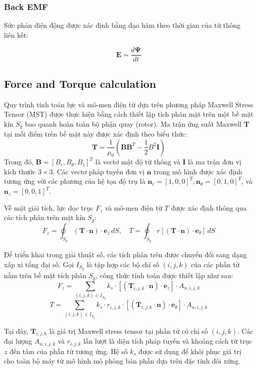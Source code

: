 \subsubsection{Back EMF}
Sức phản điện động được xác định bằng đạo hàm theo thời gian của từ thông liên kết:

\begin{equation}
\mathbf{E} = \frac{d\mathbf{\Psi}}{dt}
\end{equation}


\subsection{Force and Torque calculation}

Quy trình tính toán lực và mô-men điện từ dựa trên phương pháp Maxwell Stress Tensor (MST) được thực hiện bằng cách thiết lập tích phân mặt trên một bề mặt kín $S_g$ bao quanh hoàn toàn bộ phận quay (rotor). Ma trận ứng suất Maxwell $\mathbf{T}$ tại mỗi điểm trên bề mặt này được xác định theo biểu thức:
\begin{equation}
    \mathbf{T} = \frac{1}{\mu_0} \left( \mathbf{B} \mathbf{B}^T - \frac{1}{2} B^2 \mathbf{I} \right)
\end{equation}
Trong đó, $\mathbf{B} = [B_r, B_\theta, B_z]^T$ là vectơ mật độ từ thông và $\mathbf{I}$ là ma trận đơn vị kích thước $3 \times 3$. Các vectơ pháp tuyến đơn vị $\mathbf{n}$ trong mô hình được xác định tương ứng với các phương của hệ tọa độ trụ là $\mathbf{n}_r = [1, 0, 0]^T, \mathbf{n}_\theta = [0, 1, 0]^T$, và $\mathbf{n}_z = [0, 0, 1]^T$.

Về mặt giải tích, lực dọc trục $F_z$ và mô-men điện từ $T$ được xác định thông qua các tích phân trên mặt kín $S_g$:
\begin{equation}
    F_z = \oint_{S_g} (\mathbf{T} \cdot \mathbf{n}) \cdot \mathbf{e}_z \, dS, \quad T = \oint_{S_g} r [(\mathbf{T} \cdot \mathbf{n}) \cdot \mathbf{e}_\theta] \, dS
\end{equation}

Để triển khai trong giải thuật số, các tích phân trên được chuyển đổi sang dạng xấp xỉ tổng đại số. Gọi $I_{S_g}$ là tập hợp các bộ chỉ số $(i, j, k)$ của các phần tử nằm trên bề mặt tích phân $S_g$, công thức tính toán được thiết lập như sau:
\begin{equation}
    F_z = \sum_{(i,j,k) \in I_{S_g}} k_s \cdot [(\mathbf{T}_{i,j,k} \cdot \mathbf{n}) \cdot \mathbf{e}_z] \cdot A_{n,i,j,k}
\end{equation}
\begin{equation}
    T = \sum_{(i,j,k) \in I_{S_g}} k_s \cdot r_{i,j,k} \cdot [(\mathbf{T}_{i,j,k} \cdot \mathbf{n}) \cdot \mathbf{e}_\theta] \cdot A_{n,i,j,k}
\end{equation}

Tại đây, $\mathbf{T}_{i,j,k}$ là giá trị Maxwell stress tensor tại phần tử có chỉ số $(i, j, k)$. Các đại lượng $A_{n,i,j,k}$ và $r_{i,j,k}$ lần lượt là diện tích pháp tuyến và khoảng cách từ trục $z$ đến tâm của phần tử tương ứng. Hệ số $k_s$ được sử dụng để khôi phục giá trị cho toàn bộ máy từ mô hình mô phỏng bán phần dựa trên đặc tính đối xứng.